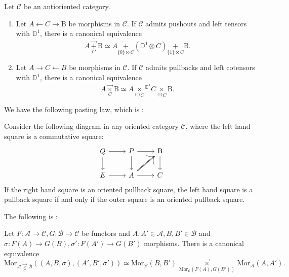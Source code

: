 \documentclass[10pt,oneside]{article}
\numberwithin{equation}{section} %
\numberwithin{figure}{section} %
\theoremstyle{plain}
\theoremstyle{definition}
\newcommand{\bD}{{\mathbb D}}
\renewcommand{\P}{{\mathbb P}}
\newcommand{\mA}{{\mathcal A}}
\newcommand{\mB}{{\mathcal B}}
\newcommand{\mC}{{\mathcal C}}
\newcommand{\A}{A}
\newcommand{\B}{\mathrm{B}}
\newcommand{\C}{C}
\newcommand{\E}{{E}}
\newcommand{\F}{{F}}
\newcommand{\G}{{G}}
\renewcommand{\P}{{P}}
\newcommand{\Q}{{Q}}
\newcommand{\ot}{\otimes}
\newcommand{\Mor}{{\mathrm{Mor}}}
\begin{document}
\begin{corollary}\label{bdesc}
Let $\mC$ be an antioriented category.
\begin{enumerate}[\normalfont(1)]\setlength{\itemsep}{-2pt}
\item 
Let $A \leftarrow C \to \B$ be morphisms in $\mC$. If $\mC$ admits pushouts and left tensors with $\bD^1$, 
there is a canonical equivalence $$\A\,\underset{C}{\bar{\vec{+}}}\, \B \simeq \A \underset{\{0\}\otimes\C}{+} ( \bD^1\ot \C) \underset{\{1\}\otimes\C}{+} \B.$$	

\item Let $A \to C\leftarrow B$ be morphisms in $\mC$. If $\mC$ admits pullbacks and left cotensors with $\bD^1$, 
there is a canonical equivalence $$\A\underset{C}{\bar{\vec{\times}}} \B \simeq \A \underset{^{\{0\}}\C}{\times}{^{\bD^1}\C} \underset{^{\{1\}}\C}{\times} \B.$$	
\end{enumerate}

\end{corollary}


We have the following pasting law, which is \cite[Lemma 3.8.11.]{oriented}:

\begin{lemma}\label{pasting}

Consider the following diagram in any oriented category $\mC$, where the left hand square is a commutative square:
\[
\begin{tikzcd}
\Q \ar{d} \ar{r} & \P \ar{r}{} \ar{d}[swap]{} & \B  \ar{d}{} \\
\E \ar{r} & \A \ar[double]{ur}{}  \ar{r}[swap]{} & \C
\end{tikzcd}
\]
If the right hand square is an oriented pullback square, the left hand square is a pullback square if and only if the outer square is an oriented pullback square.

\end{lemma}

The following is \cite[Proposition 3.8.12.]{oriented}:

\begin{proposition}\label{homs} 
Let $\F: \mA \to \mC,\G: \mB \to \mC$ be functors and $\A,\A'\in \mA, B,B' \in \mB$ and $\sigma: \F(\A)\to \G(B), \sigma': \F(\A')\to \G(B')$ morphisms. There is a canonical equivalence $$\Mor_{{\mA \,\underset{\mC}{\vec{\times}}}\, \mB}((\A,B, \sigma),(\A',B', \sigma')) \simeq {\Mor_\mB(B,B') \,\underset{\Mor_\mC(\F(\A),\G(B'))}{\vec{\times}}}\, \Mor_{\mA}(\A,\A').$$

\end{proposition}
\end{document}
